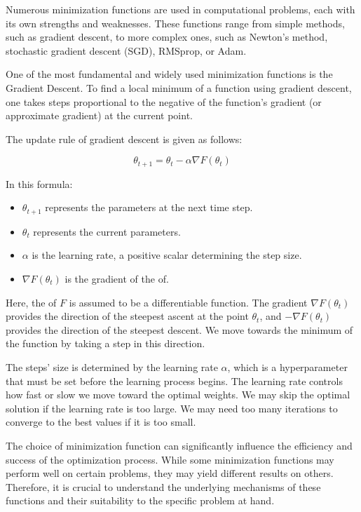 \documentclass[
  a4paper,  %
  twoside,  %
  bibliography=totoc,
  headsepline,
  cleardoublepage=empty,
  parskip=half,
  draft=false
]{scrbook}
\begin{document}
Numerous minimization functions are used in computational problems, each with its own strengths and weaknesses.
These functions range from simple methods, such as gradient descent, to more complex ones, such as Newton's method, stochastic gradient descent (SGD), RMSprop, or Adam.

One of the most fundamental and widely used minimization functions is the Gradient Descent.
To find a local minimum of a function using gradient descent, one takes steps proportional to the negative of the function's gradient (or approximate gradient) at the current point.

The update rule of gradient descent is given as follows:

\[
\theta_{t+1} = \theta_t - \alpha \nabla F(\theta_t)
\]

In this formula:

\begin{itemize}
  \item \(\theta_{t+1}\) represents the parameters at the next time step.
  \item \(\theta_t\) represents the current parameters.
  \item \(\alpha\) is the learning rate, a positive scalar determining the step size.
  \item \(\nabla F(\theta_t)\) is the gradient of the \gls{of}.
\end{itemize}

Here, the \gls{of} \(F\) is assumed to be a differentiable function.
The gradient \(\nabla F(\theta_t)\) provides the direction of the steepest ascent at the point \(\theta_t\), and \(-\nabla F(\theta_t)\) provides the direction of the steepest descent.
We move towards the minimum of the function by taking a step in this direction.

The steps' size is determined by the learning rate \(\alpha\), which is a hyperparameter that must be set before the learning process begins.
The learning rate controls how fast or slow we move toward the optimal weights.
We may skip the optimal solution if the learning rate is too large.
We may need too many iterations to converge to the best values if it is too small.

The choice of minimization function can significantly influence the efficiency and success of the optimization process.
While some minimization functions may perform well on certain problems, they may yield different results on others.
Therefore, it is crucial to understand the underlying mechanisms of these functions and their suitability to the specific problem at hand.
\end{document}
